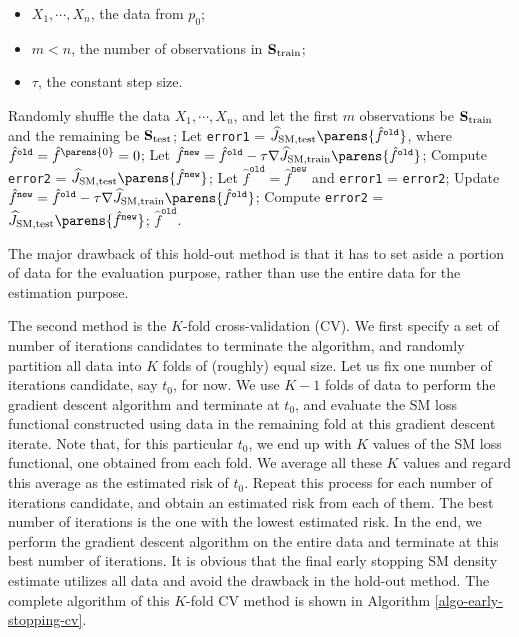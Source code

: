 \begin{algorithm}
\caption{Hold-out method to determine when to terminate}\label{algo-early-stopping-holdout}
\begin{algorithmic}[1]
\Statex \algorithmicrequire 
\begin{itemize}\setlength\itemsep{0em}
	\item $X_1, \cdots, X_n$, the data from $p_0$; 
	\item $m < n$, the number of observations in $\mathbf{S}_{\mathrm{train}}$; 
	\item $\tau$, the constant step size. 
\end{itemize}

\State Randomly shuffle the data $X_1, \cdots, X_n$, and let the first $m$ observations be $\mathbf{S}_{\mathrm{train}}$ and the remaining be $\mathbf{S}_{\mathrm{test}}$; 
\State Let \texttt{error1} = $\widehat{J}_{\SM, \mathrm{test}} \parens{\hat{f}^{\mathtt{old}}}$, where $\hat{f}^{\mathtt{old}} = \hat{f}^{\parens{0}} = 0$; 
\State Let $\hat{f}^{\mathtt{new}} = \hat{f}^{\mathtt{old}} - \tau \nabla \widehat{J}_{\SM, \mathrm{train}} \parens{\hat{f}^{\mathtt{old}}}$; 
\State Compute \texttt{error2} = $\widehat{J}_{\SM, \mathrm{test}} \parens{\hat{f}^{\mathtt{new}}}$; 
\State Let $\hat{f}^{\mathtt{old}} = \hat{f}^{\mathtt{new}}$ and \texttt{error1} = \texttt{error2};  
\State Update $\hat{f}^{\mathtt{new}} = \hat{f}^{\mathtt{old}} - \tau \nabla \widehat{J}_{\SM, \mathrm{train}} \parens{\hat{f}^{\mathtt{old}}}$; 
\State Compute \texttt{error2} = $\widehat{J}_{\SM, \mathrm{test}} \parens{\hat{f}^{\mathtt{new}}}$; 
\EndWhile
\State \Return $\hat{f}^{\mathtt{old}}$. 
\end{algorithmic}
\end{algorithm}

The major drawback of this hold-out method is that it has to set aside a portion of data for the evaluation purpose, rather than use the entire data for the estimation purpose. 

The second method is the $K$-fold cross-validation (CV). We first specify a set of number of iterations candidates to terminate the algorithm, and randomly partition all data into $K$ folds of (roughly) equal size. Let us fix one number of iterations candidate, say $t_0$, for now. We use $K-1$ folds of data to perform the gradient descent algorithm and terminate at $t_0$, and evaluate the SM loss functional constructed using data in the remaining fold at this gradient descent iterate. Note that, for this particular $t_0$, we end up with $K$ values of the SM loss functional, one obtained from each fold. We average all these $K$ values and regard this average as the estimated risk of $t_0$. Repeat this process for each number of iterations candidate, and obtain an estimated risk from each of them. The best number of iterations is the one with the lowest estimated risk. In the end, we perform the gradient descent algorithm on the entire data and terminate at this best number of iterations. It is obvious that the final early stopping SM density estimate utilizes all data and avoid the drawback in the hold-out method. The complete algorithm of this $K$-fold CV method is shown in Algorithm \ref{algo-early-stopping-cv}. 

